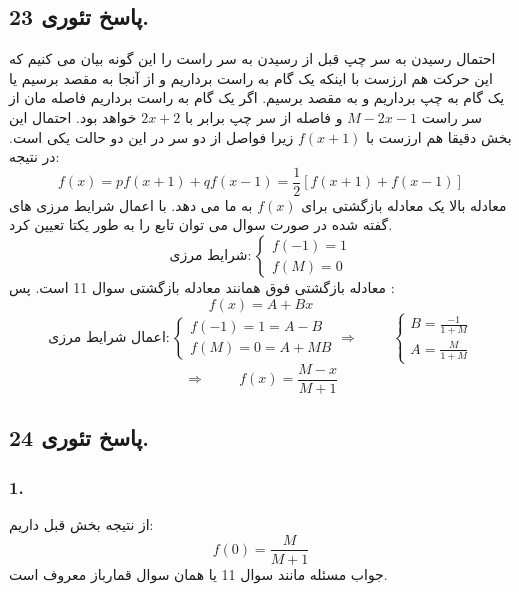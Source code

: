 \documentclass[]{article}
\begin{document}
\subsection{پاسخ تئوری 23.}
احتمال رسیدن به سر چپ قبل از رسیدن به سر راست را این گونه بیان می کنیم که این حرکت هم ارزست با اینکه یک گام به راست برداریم و از آنجا به مقصد برسیم یا یک گام به چپ برداریم و به مقصد برسیم. اگر یک گام به راست برداریم فاصله مان از سر راست 
$M - 2x - 1$
و فاصله از سر چپ برابر با
$2x+2$
خواهد بود. احتمال این بخش دقیقا هم ارزست با  
$f(x+1)$
زیرا فواصل از دو سر در این دو حالت یکی است. در نتیجه:
\begin{equation}
	\nonumber
	f(x) = p f(x+1) + q f(x-1) = \frac{1}{2} [f(x+1)+f(x-1)]
\end{equation}
معادله بالا یک معادله بازگشتی برای 
$f(x)$
به ما می دهد. با اعمال شرایط مرزی های گفته شده در صورت سوال می توان تابع را به طور یکتا تعیین کرد.
\begin{equation}
	\nonumber
	\text{شرایط مرزی} :
	\begin{cases}
		f(-1) = 1\\
		f(M) = 0
	\end{cases}
\end{equation}
معادله بازگشتی فوق همانند معادله بازگشتی سوال 11 است. پس :
\begin{equation}
	\nonumber
	f(x) = A+Bx
\end{equation}
\begin{equation}
	\nonumber
	\text{اعمال شرایط مرزی} :
	\begin{cases}
		f(-1) = 1 = A - B\\
		f(M) = 0 = A + MB
	\end{cases}
	\Rightarrow \hspace{1cm}
	\begin{cases}
		B = \frac{-1}{1+M}\\
		A = \frac{M}{1+M}
	\end{cases}
\end{equation}
\begin{equation}
	\nonumber
	\Rightarrow \hspace{1cm} f(x) = \frac{M - x}{M + 1}
\end{equation}
\newpage
\subsection{پاسخ تئوری 24.}
\subsubsection{1.}
از نتیجه بخش قبل داریم:
\begin{equation}
	\nonumber
	f(0) = \frac{M}{M+1}
\end{equation}
جواب مسئله مانند سوال 11 یا همان سوال قمارباز معروف است.
\end{document}
